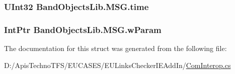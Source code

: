 \hypertarget{struct_band_objects_lib_1_1_m_s_g_afa248537123e634e2eb593fce7ba444c}{
\subsubsection[{time}]{\setlength{\rightskip}{0pt plus 5cm}U\+Int32 Band\+Objects\+Lib.\+M\+S\+G.\+time}}\label{struct_band_objects_lib_1_1_m_s_g_afa248537123e634e2eb593fce7ba444c}
\hypertarget{struct_band_objects_lib_1_1_m_s_g_ae33250f9183c57d5acaf4d805ddfb04e}{
\subsubsection[{w\+Param}]{\setlength{\rightskip}{0pt plus 5cm}Int\+Ptr Band\+Objects\+Lib.\+M\+S\+G.\+w\+Param}}\label{struct_band_objects_lib_1_1_m_s_g_ae33250f9183c57d5acaf4d805ddfb04e}


The documentation for this struct was generated from the following file\+:\begin{DoxyCompactItemize}
\item 
D\+:/\+Apis\+Techno\+T\+F\+S/\+E\+U\+C\+A\+S\+E\+S/\+E\+U\+Links\+Checker\+I\+E\+Add\+In/\hyperlink{_com_interop_8cs}{Com\+Interop.\+cs}\end{DoxyCompactItemize}
